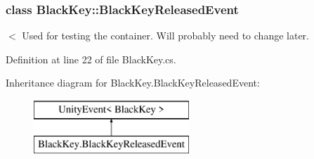 \subsubsection{class Black\+Key\+:\+:Black\+Key\+Released\+Event}
$<$ Used for testing the container. Will probably need to change later. 

Definition at line 22 of file Black\+Key.\+cs.

Inheritance diagram for Black\+Key.\+Black\+Key\+Released\+Event\+:\begin{figure}[H]
\begin{center}
\leavevmode
\includegraphics[height=2.000000cm]{group___black_key_types}
\end{center}
\end{figure}
